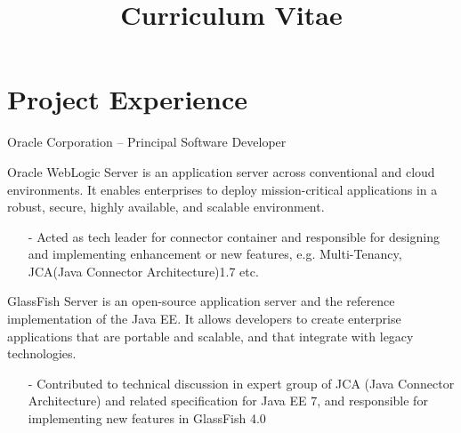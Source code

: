 \documentclass[11pt,a4paper]{moderncv}
\title{Curriculum Vitae }
\begin{document}
\maketitle


\section{Project Experience}
\vspace{2ex}  
{ Oracle Corporation -- Principal Software Developer}{}{}{}{}
\vspace{1ex}  
{
  Oracle WebLogic Server is an application server across conventional and cloud environments. It enables enterprises to deploy mission-critical applications in a robust, secure, highly available, and scalable environment.
  \begin{itemize}
    \item[-] Acted as tech leader for connector container and responsible for designing and implementing enhancement or 
               new features, e.g. Multi-Tenancy, JCA(Java Connector Architecture)1.7 etc.
  \end{itemize}
}

\vspace*{0.2\baselineskip}
{
  GlassFish Server is an open-source application server  and the reference implementation of the Java EE. It allows developers to create enterprise 
  applications that are portable and scalable,  and that integrate with legacy technologies.
  \begin{itemize}
    \item[-]Contributed to technical discussion in expert group of JCA (Java Connector Architecture) and related specification for Java EE 7, and responsible for implementing new features in GlassFish 4.0
  \end{itemize}
}
\end{document}
